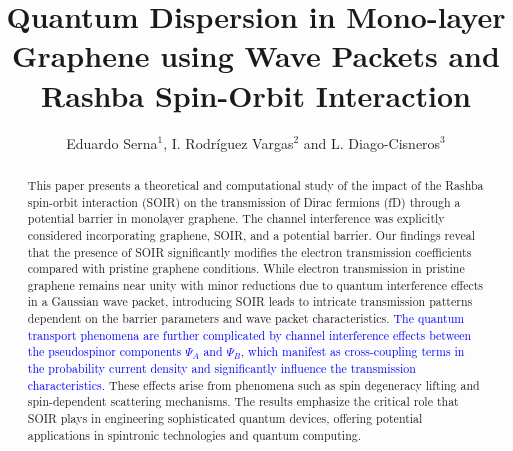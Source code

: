 \documentclass{../assets/templates/iopjournal}
\begin{document}

    \title{Quantum Dispersion in Mono-layer Graphene using Wave Packets and Rashba Spin-Orbit Interaction}
    
    \author{Eduardo Serna$^1$, I. Rodr\'iguez Vargas$^2$ and L. Diago-Cisneros$^3$}
    
       
    
    
    
    

    \begin{abstract}
        This paper presents a theoretical and computational study of the impact of the Rashba spin-orbit interaction (SOIR) on the transmission of Dirac fermions (fD) through a potential barrier in monolayer graphene. The channel interference was explicitly considered incorporating graphene, SOIR, and a potential barrier.
        Our findings reveal that the presence of SOIR significantly modifies the electron transmission coefficients compared with pristine graphene conditions.
        While electron transmission in pristine graphene remains near unity with minor reductions due to quantum interference effects in a Gaussian wave packet, introducing SOIR leads to intricate transmission patterns dependent on the barrier parameters and wave packet characteristics.
        \textcolor{blue}{The quantum transport phenomena are further complicated by channel interference effects between the pseudospinor components $\Psi_A$ and $\Psi_B$, which manifest as cross-coupling terms in the probability current density and significantly influence the transmission characteristics.}
        These effects arise from phenomena such as spin degeneracy lifting and spin-dependent scattering mechanisms.
        The results emphasize the critical role that SOIR plays in engineering sophisticated quantum devices, offering potential applications in spintronic technologies and quantum computing.
    \end{abstract}
\end{document}
